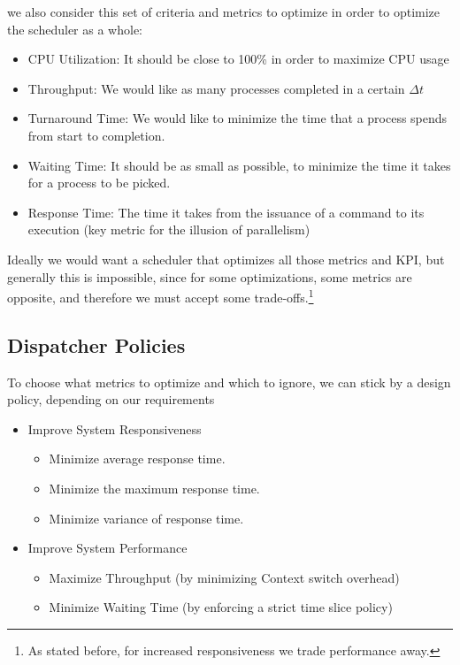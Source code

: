 \documentclass[openright, twoside]{report}
\theoremstyle{definition}
\theoremstyle{example}
\begin{document}
				we also consider this set of criteria and metrics to optimize in order to 
				optimize the scheduler as a whole:

				\begin{itemize}
					\item CPU Utilization: It should be close to 100\% in order to maximize 
					CPU usage
					\item Throughput: We would like as many processes completed in a certain 
					$\Delta{t}$
					\item Turnaround Time: We would like to minimize the time that a process 
					spends from start to completion.
					\item Waiting Time: It should be as small as possible, to minimize the time
					it takes for a process to be picked.
					\item Response Time: The time it takes from the issuance of a command to 
					its execution (key metric for the illusion of parallelism)
				\end{itemize}

				Ideally we would want a scheduler that optimizes all those metrics and KPI, but 
				generally this is impossible, since for some optimizations, some metrics are 
				opposite, and therefore we must accept some trade-offs.\footnote{As stated before, for 
				increased responsiveness we trade performance away.}
				
			\subsection{Dispatcher Policies}
				To choose what metrics to optimize and which to ignore, we can stick 
				by a design policy, depending on our requirements
			\begin{itemize}
				\item Improve System Responsiveness
				\begin{itemize}
					\item Minimize average response time.
					\item Minimize the maximum response time.
					\item Minimize variance of response time.
				\end{itemize}
				\item Improve System Performance
				\begin{itemize}
					\item Maximize Throughput (by minimizing Context switch overhead)
					\item Minimize Waiting Time (by enforcing a strict time slice policy)
				\end{itemize}
			\end{itemize}
\end{document}
